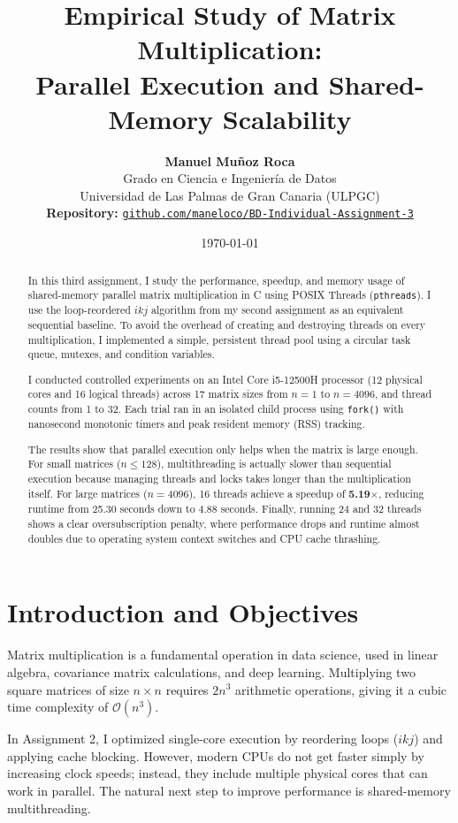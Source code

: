 \documentclass[11pt,a4paper]{article}
\title{\textbf{Empirical Study of Matrix Multiplication:\\Parallel Execution and Shared-Memory Scalability}}
\author{\textbf{Manuel Muñoz Roca} \\
Grado en Ciencia e Ingeniería de Datos \\
Universidad de Las Palmas de Gran Canaria (ULPGC) \\
\vspace{0.15cm}
\small \textbf{Repository:} \href{https://github.com/maneloco/BD-Individual-Assignment-3}{\texttt{github.com/maneloco/BD-Individual-Assignment-3}}}
\date{\today}
\begin{document}
\maketitle

\begin{abstract}
In this third assignment, I study the performance, speedup, and memory usage of shared-memory parallel matrix multiplication in C using POSIX Threads (\texttt{pthreads}). I use the loop-reordered $ikj$ algorithm from my second assignment as an equivalent sequential baseline. To avoid the overhead of creating and destroying threads on every multiplication, I implemented a simple, persistent thread pool using a circular task queue, mutexes, and condition variables.

I conducted controlled experiments on an Intel Core i5-12500H processor (12 physical cores and 16 logical threads) across 17 matrix sizes from $n = 1$ to $n = 4096$, and thread counts from 1 to 32. Each trial ran in an isolated child process using \texttt{fork()} with nanosecond monotonic timers and peak resident memory (RSS) tracking.

The results show that parallel execution only helps when the matrix is large enough. For small matrices ($n \le 128$), multithreading is actually slower than sequential execution because managing threads and locks takes longer than the multiplication itself. For large matrices ($n = 4096$), 16 threads achieve a speedup of \textbf{5.19$\times$}, reducing runtime from 25.30 seconds down to 4.88 seconds. Finally, running 24 and 32 threads shows a clear oversubscription penalty, where performance drops and runtime almost doubles due to operating system context switches and CPU cache thrashing.
\end{abstract}

\section{Introduction and Objectives}

Matrix multiplication is a fundamental operation in data science, used in linear algebra, covariance matrix calculations, and deep learning. Multiplying two square matrices of size $n \times n$ requires $2n^3$ arithmetic operations, giving it a cubic time complexity of $\mathcal{O}(n^3)$.

In Assignment 2, I optimized single-core execution by reordering loops ($ikj$) and applying cache blocking. However, modern CPUs do not get faster simply by increasing clock speeds; instead, they include multiple physical cores that can work in parallel. The natural next step to improve performance is shared-memory multithreading.
\end{document}
